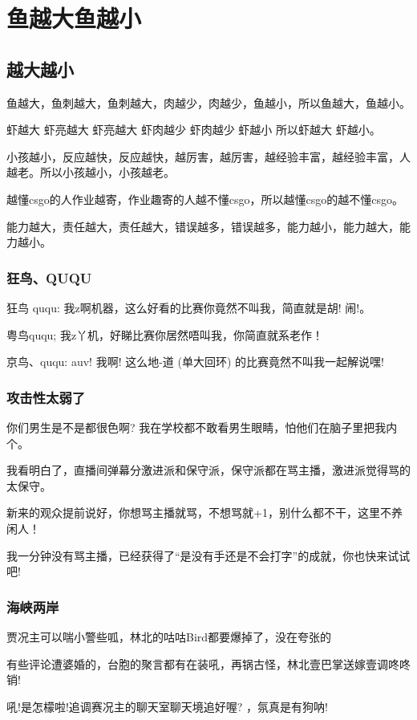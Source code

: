 
\iffalse
\fi


\chapter{鱼越大鱼越小}

\section{越大越小}

鱼越大，鱼刺越大，鱼刺越大，肉越少，肉越少，鱼越小，所以鱼越大，鱼越小\cite{zhang2010tree}。

虾越大 虾亮越大 虾亮越大 虾肉越少 虾肉越少 虾越小 所以虾越大 虾越小。

小孩越小，反应越快，反应越快，越厉害，越厉害，越经验丰富，越经验丰富，人越老。所以小孩越小，小孩越老。

越懂csgo的人作业越寄，作业趣寄的人越不懂csgo，所以越懂csgo的越不懂csgo。

能力越大，责任越大，责任越大，错误越多，错误越多，能力越小，能力越大，能力越小。

\subsection{狂鸟、QUQU}

狂鸟 ququ: 我z啊机器，这么好看的比赛你竟然不叫我，简直就是胡! 闹!\cite{deng:01a}。

粤鸟ququ; 我z丫机，好睇比赛你居然唔叫我，你简直就系老作！

京鸟、ququ: auv! 我啊! 这么地-道 (单大回环) 的比赛竟然不叫我一起解说嘿! 

\subsection{攻击性太弱了}

你们男生是不是都很色啊? 我在学校都不敢看男生眼睛，怕他们在脑子里把我内个。

我看明白了，直播间弹幕分激进派和保守派，保守派都在骂主播，激进派觉得骂的太保守。

新来的观众提前说好，你想骂主播就骂，不想骂就+1，别什么都不干，这里不养闲人！

我一分钟没有骂主播，已经获得了“是没有手还是不会打字”的成就，你也快来试试吧!

\subsection{海峡两岸}

贾况主可以喘小警些呱，林北的咕咕Bird都要爆掉了，没在夸张的

有些评论遭婆婚的，台胞的聚言都有在装吼，再锅古怪，林北壹巴掌送嫁壹调咚咚销!

吼!是怎檬啦!追调赛况主的聊天室聊天境追好喔? ，氛真是有狗呐!



